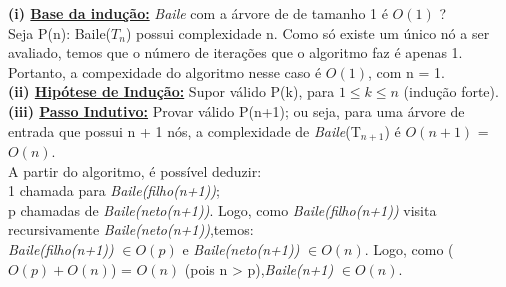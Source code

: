 \documentclass[a4paper]{article}
\begin{document}
\textbf{(i) \underline{Base da indução:}} \emph{Baile} com a árvore de de tamanho 1 é $O(1)$ ?\\
\qquad Seja P(n): Baile($T_n$) possui complexidade n. Como só existe um único nó a ser avaliado, temos que o número de iterações que o algoritmo faz é apenas 1. Portanto, a compexidade do algoritmo nesse caso é $O(1)$, com n = 1.\\

\textbf{(ii) \underline{Hipótese de Indução:}} Supor válido P(k), para $1\leq k \leq n$ (indução forte).\\

\textbf{(iii) \underline{Passo Indutivo:}} Provar válido P(n+1); ou seja, para uma árvore de entrada que possui n + 1 nós, a complexidade de \emph{Baile}(T$_{n+1}$) é $O(n+1)$ = $O(n)$.\\
A partir do algoritmo, é possível deduzir:\\
1 chamada para \emph{Baile(filho(n+1))};\\
p chamadas de \emph{Baile(neto(n+1))}. Logo, como \emph{Baile(filho(n+1))} visita recursivamente \emph{Baile(neto(n+1))},temos:\\
\emph{Baile(filho(n+1))} $\in O(p)$ e \emph{Baile(neto(n+1))} $\in O(n)$. Logo, como ($O(p) + O(n)$) = $O(n)$ (pois n > p),\emph{Baile(n+1)} $\in O(n)$.
\end{document}
